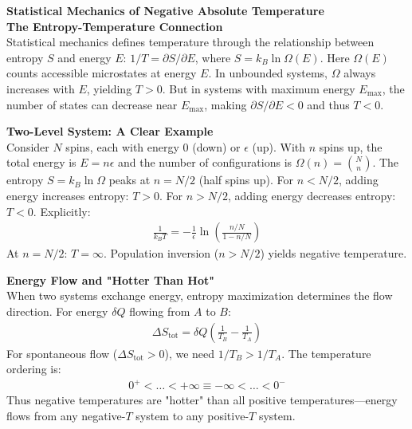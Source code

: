 \begin{technical}
{\Large\textbf{Statistical Mechanics of Negative Absolute Temperature}}\\[0.7em]

\noindent\textbf{The Entropy-Temperature Connection}\\[0.5em]
Statistical mechanics defines temperature through the relationship between entropy $S$ and energy $E$: $1/T = \partial S/\partial E$, where $S = k_B \ln \Omega(E)$. Here $\Omega(E)$ counts accessible microstates at energy $E$. In unbounded systems, $\Omega$ always increases with $E$, yielding $T > 0$. But in systems with maximum energy $E_{\max}$, the number of states can decrease near $E_{\max}$, making $\partial S/\partial E < 0$ and thus $T < 0$.

\noindent\textbf{Two-Level System: A Clear Example}\\[0.5em]
Consider $N$ spins, each with energy 0 (down) or $\epsilon$ (up). With $n$ spins up, the total energy is $E = n\epsilon$ and the number of configurations is $\Omega(n) = \binom{N}{n}$. The entropy $S = k_B \ln \Omega$ peaks at $n = N/2$ (half spins up). For $n < N/2$, adding energy increases entropy: $T > 0$. For $n > N/2$, adding energy decreases entropy: $T < 0$. Explicitly:
\begin{align}
\frac{1}{k_B T} = -\frac{1}{\epsilon} \ln \left( \frac{n/N}{1 - n/N} \right)
\end{align}
At $n = N/2$: $T = \infty$. Population inversion ($n > N/2$) yields negative temperature.

\noindent\textbf{Energy Flow and "Hotter Than Hot"}\\[0.5em]
When two systems exchange energy, entropy maximization determines the flow direction. For energy $\delta Q$ flowing from $A$ to $B$:
\begin{align}
\Delta S_{\text{tot}} = \delta Q \left( \frac{1}{T_B} - \frac{1}{T_A} \right)
\end{align}
For spontaneous flow ($\Delta S_{\text{tot}} > 0$), we need $1/T_B > 1/T_A$. The temperature ordering is:
\begin{align}
0^+ < \ldots < +\infty \equiv -\infty < \ldots < 0^-
\end{align}
Thus negative temperatures are "hotter" than all positive temperatures—energy flows from any negative-$T$ system to any positive-$T$ system.


\end{technical}
